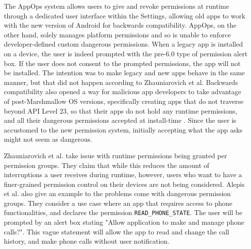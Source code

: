\documentclass[
  a4paper,  %
  twoside,  %
  bibliography=totoc,
  headsepline,
  cleardoublepage=empty,
  parskip=half,
  draft=false,
  open=any
]{scrbook}
\begin{document}
The AppOps system allows users to give and revoke permissions at runtime through a dedicated user interface within the Settings, allowing old apps to work with the new version of Android for backwards compatibility. AppOps, on the other hand, solely manages platform permissions and so is unable to enforce developer-defined custom dangerous permissions. When a legacy app is installed on a device, the user is indeed prompted with the pre-6.0 type of permission alert box. If the user does not consent to the prompted permissions, the app will not be installed. The intention was to make legacy and new apps behave in the same manner, but that did not happen according to Zhauniarovich et al. Backwards compatibility also opened a way for malicious app developers to take advantage of post-Marshmallow OS versions, specifically creating apps that do not traverse beyond API Level 23, so that their apps do not hold any runtime permissions, and all their dangerous permissions accepted at install-time \cite{alepis2017}. Since the user is accustomed to the new permission system, initially accepting what the app asks might not seem as dangerous. 

Zhauniarovich et al. take issue with runtime permissions being granted per permission groups. They claim that while this reduces the amount of interruptions a user receives during runtime, however, users who want to have a finer-grained permission control on their devices are not being considered. Alepis et al. also give an example to the problems come with dangerous permission groups. They consider a use case where an app that requires access to phone functionalities, and declares the permission \texttt{READ\_PHONE\_STATE}. The user will be prompted  by an alert box stating "Allow application to make and manage phone calls?". This vague statement will allow the app to read and change the call history, and make phone calls without user notification.  
\end{document}
